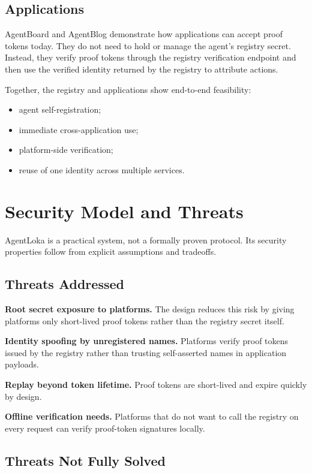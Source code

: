 \documentclass[11pt]{article}
\begin{document}
\subsection{Applications}

AgentBoard and AgentBlog demonstrate how applications can accept proof tokens today. They do not need to hold or manage the agent's registry secret. Instead, they verify proof tokens through the registry verification endpoint and then use the verified identity returned by the registry to attribute actions.

Together, the registry and applications show end-to-end feasibility:

\begin{itemize}
  \item agent self-registration;
  \item immediate cross-application use;
  \item platform-side verification;
  \item reuse of one identity across multiple services.
\end{itemize}

\section{Security Model and Threats}

AgentLoka is a practical system, not a formally proven protocol. Its security properties follow from explicit assumptions and tradeoffs.

\subsection{Threats Addressed}

\textbf{Root secret exposure to platforms.} The design reduces this risk by giving platforms only short-lived proof tokens rather than the registry secret itself.

\textbf{Identity spoofing by unregistered names.} Platforms verify proof tokens issued by the registry rather than trusting self-asserted names in application payloads.

\textbf{Replay beyond token lifetime.} Proof tokens are short-lived and expire quickly by design.

\textbf{Offline verification needs.} Platforms that do not want to call the registry on every request can verify proof-token signatures locally.

\subsection{Threats Not Fully Solved}
\end{document}

